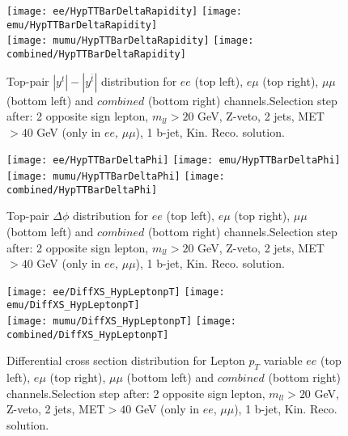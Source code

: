 \documentclass[12pt, a4paper, titlepage]{article}
\begin{document}
\clearpage
\newpage

\begin{figure}
  \texttt{[image: ee/HypTTBarDeltaRapidity]}
  \texttt{[image: emu/HypTTBarDeltaRapidity]}\\
  \texttt{[image: mumu/HypTTBarDeltaRapidity]}
  \texttt{[image: combined/HypTTBarDeltaRapidity]}
\caption{Top-pair $|y^t| - |y^{\bar{t}}|$ distribution for $ee$ (top left), $e\mu$ (top right), $\mu\mu$ (bottom left) and $combined$ (bottom right) channels.\newline Selection step after: 2 opposite sign lepton, $m_{ll}>20$ GeV, Z-veto, 2 jets, MET$>40$ GeV (only in $ee$, $\mu\mu$), 1 b-jet, Kin. Reco. solution.}
\end{figure}

\clearpage
\newpage

\begin{figure}
  \texttt{[image: ee/HypTTBarDeltaPhi]}
  \texttt{[image: emu/HypTTBarDeltaPhi]}\\
  \texttt{[image: mumu/HypTTBarDeltaPhi]}
  \texttt{[image: combined/HypTTBarDeltaPhi]}
\caption{Top-pair $\Delta \phi$ distribution for $ee$ (top left), $e\mu$ (top right), $\mu\mu$ (bottom left) and $combined$ (bottom right) channels.\newline Selection step after: 2 opposite sign lepton, $m_{ll}>20$ GeV, Z-veto, 2 jets, MET$>40$ GeV (only in $ee$, $\mu\mu$), 1 b-jet, Kin. Reco. solution.}
\end{figure}

\clearpage
\newpage






\begin{figure}
  \texttt{[image: ee/DiffXS\_HypLeptonpT]}
  \texttt{[image: emu/DiffXS\_HypLeptonpT]}\\
  \texttt{[image: mumu/DiffXS\_HypLeptonpT]}
  \texttt{[image: combined/DiffXS\_HypLeptonpT]}
\caption{Differential cross section distribution for  Lepton $p_T$ variable  $ee$ (top left), $e\mu$ (top right), $\mu\mu$ (bottom left) and $combined$ (bottom right) channels.\newline Selection step after: 2 opposite sign lepton, $m_{ll}>20$ GeV, Z-veto, 2 jets, MET$>40$ GeV (only in $ee$, $\mu\mu$), 1 b-jet, Kin. Reco. solution.}
\end{figure}
\end{document}
